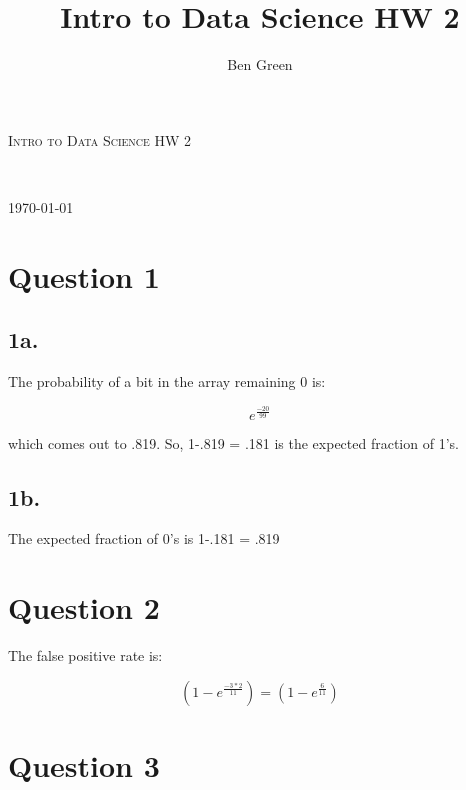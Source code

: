 \documentclass{article}
\author{Ben Green}
\title{Intro to Data Science HW 2}
\begin{document}
\begin{titlepage}
	\begin{center}
	\textsc{\LARGE Intro to Data Science HW 2}\\
	\vspace{3mm}
	
	{\large \theauthor}\\
	
	\tableofcontents
	\setcounter{secnumdepth}{0}
	\vfill
	
	{\large \today}
	\end{center}

\end{titlepage}

\section{Question 1}

\subsection{1a.}

The probability of a bit in the array remaining 0 is:

\begin{equation}
e^\frac{-20}{99}
\end{equation}

\noindent which comes out to .819. So, 1-.819 = .181 is the expected fraction of 1's.

\subsection{1b.}

The expected fraction of 0's is 1-.181 = .819

\section{Question 2}

The false positive rate is:

\begin{equation}
(1-e^{\frac{-3*2}{11}}) = (1-e^\frac{6}{11})
\end{equation}

\section{Question 3}
\end{document}
